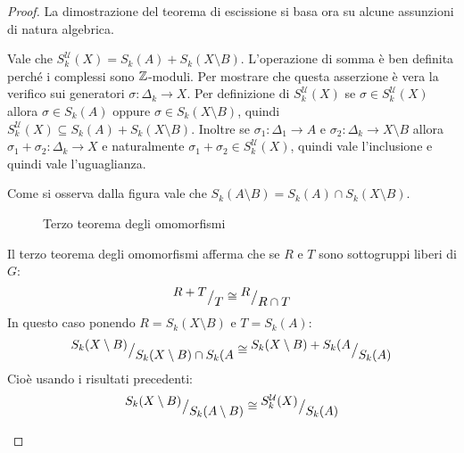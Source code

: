 \begin{proof}
  La dimostrazione del teorema di escissione si basa ora su alcune assunzioni
  di natura algebrica.

  \begin{osservation}
    Vale che $ S_k^\mathcal{U}(X) = S_k(A) + S_k(X \setminus B) $. L'operazione di somma
    è ben definita perché i complessi sono $ \mathbb{Z} $-moduli. Per mostrare che
    questa asserzione è vera la verifico sui generatori
    $ \sigma \colon \Delta_k \to X $. Per definizione di $ S_k^\mathcal{U}(X) $ se
    $ \sigma \in S_k^\mathcal{U}(X) $ allora $ \sigma \in S_k(A) $ oppure
    $ \sigma \in S_k(X\setminus B) $, quindi
    $ S_k^\mathcal{U}(X) \subseteq S_k(A) + S_k(X \setminus B) $. Inoltre se
    $ \sigma_1 \colon \Delta_1 \to A $ e
    $ \sigma_2 \colon \Delta_k \to X \setminus B $ allora
    $ \sigma_1 + \sigma_2 \colon \Delta_k \to X $ e naturalmente
    $ \sigma_1 + \sigma_2 \in S_k^\mathcal{U}(X) $, quindi vale l'inclusione e quindi vale
    l'uguaglianza.
  \end{osservation}

  \begin{osservation}
    Come si osserva dalla figura vale che $ S_k(A \setminus B) = S_k(A) \cap S_k(X \setminus B) $.
  \end{osservation}

  \begin{figure}[htbp]
    \centering
    \caption{Terzo teorema degli omomorfismi}
    \label{fig:lez14:excision_proof}
  \end{figure}

  \begin{osservation}
    Il terzo teorema degli omomorfismi afferma che se $ R $ e $ T $ sono sottogruppi
    liberi di $ G $:
    \[
      {^{\textstyle R + T}\big/_{\textstyle T}} \cong {^{\textstyle R}\big/_{\textstyle R \cap T}}
    \]
    In questo caso ponendo $ R = S_k(X \setminus B) $ e $ T = S_k(A) $:
    \[
      {^{\textstyle S_k(X \setminus B)}\big/_{\textstyle S_k(X \setminus B) \cap S_k(A}} \cong {^{\textstyle S_k(X \setminus B) + S_k(A}\big/_{\textstyle S_k(A)}}
    \]
    Cioè usando i risultati precedenti:
    \[
      {^{\textstyle S_k(X \setminus B)}\big/_{\textstyle S_k(A \setminus B)}} \cong {^{\textstyle S_k^\mathcal{U}(X)}\big/_{\textstyle S_k(A)}}
    \]
  \end{osservation}


\end{proof}
